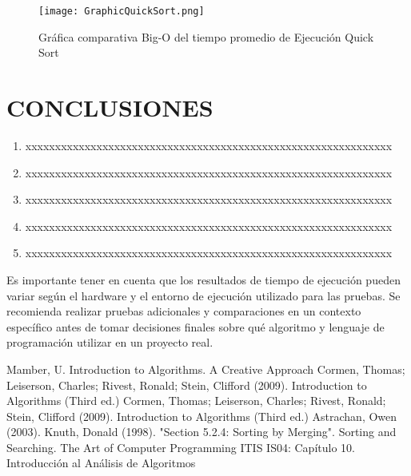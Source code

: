 \documentclass{article}
\begin{document}
    \begin{figure}[H]
    \centering
    \texttt{[image: GraphicQuickSort.png]}
    \caption{\label{fig:bigOQuickSort}Gráfica comparativa Big-O del tiempo promedio de Ejecución Quick Sort}
    \end{figure}


\section{CONCLUSIONES}
\begin{enumerate}
  \item xxxxxxxxxxxxxxxxxxxxxxxxxxxxxxxxxxxxxxxxxxxxxxxxxxxxxxxxxxxxxx
  \item xxxxxxxxxxxxxxxxxxxxxxxxxxxxxxxxxxxxxxxxxxxxxxxxxxxxxxxxxxxxxx
  \item xxxxxxxxxxxxxxxxxxxxxxxxxxxxxxxxxxxxxxxxxxxxxxxxxxxxxxxxxxxxxx
  \item xxxxxxxxxxxxxxxxxxxxxxxxxxxxxxxxxxxxxxxxxxxxxxxxxxxxxxxxxxxxxx
  \item xxxxxxxxxxxxxxxxxxxxxxxxxxxxxxxxxxxxxxxxxxxxxxxxxxxxxxxxxxxxxx

\end{enumerate}
Es importante tener en cuenta que los resultados de tiempo de ejecución pueden variar según el hardware y el entorno de ejecución utilizado para las pruebas. Se recomienda realizar pruebas adicionales y comparaciones en un contexto específico antes de tomar decisiones finales sobre qué algoritmo y lenguaje de programación utilizar en un proyecto real.


\begin{thebibliography}{widest entry} 
  \bibitem[1]{} Mamber, U. Introduction to Algorithms. A Creative Approach
  \bibitem[2]{} Cormen, Thomas; Leiserson, Charles; Rivest, Ronald; Stein, Clifford (2009). Introduction to Algorithms (Third ed.)
  \bibitem[3]{} Cormen, Thomas; Leiserson, Charles; Rivest, Ronald; Stein, Clifford (2009). Introduction to Algorithms (Third ed.)
  \bibitem[4]{} Astrachan, Owen (2003).
  \bibitem[5]{} Knuth, Donald (1998). "Section 5.2.4: Sorting by Merging". Sorting and Searching. The Art of Computer Programming
  \bibitem[6]{} ITIS IS04: Capítulo 10. Introducción al Análisis de Algoritmos
 \end{thebibliography}
\end{document}
